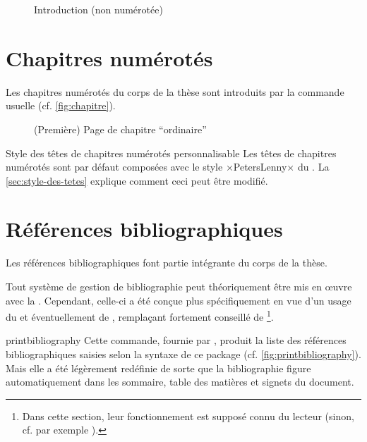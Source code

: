 \begin{figure}[p]
  \centering
  \caption{Introduction (non numérotée)}
  \label{fig:introduction}
\end{figure}

\section{Chapitres numérotés}
\label{sec:chapitres-numerotes}

Les chapitres numérotés du corps de la thèse sont introduits par la commande
usuelle  (cf. \vref{fig:chapitre}).

\begin{figure}[ht]
  \centering
  \caption[Chapitre \enquote{ordinaire}]{(Première) Page de chapitre
    \enquote{ordinaire}}
  \label{fig:chapitre}
\end{figure}

\begin{dbremark}{Style des têtes de chapitres numérotés personnalisable}{}
  Les têtes de chapitres numérotés sont par défaut composées avec le style
  ×PetersLenny× du . La \vref{sec:style-des-tetes} explique
  comment ceci peut être modifié.
\end{dbremark}

\section{Références bibliographiques}

Les références bibliographiques font partie intégrante du corps de la thèse.

Tout système de gestion de bibliographie peut théoriquement être mis en œuvre
avec la \yatcl. Cependant, celle-ci a été conçue plus spécifiquement en vue
d'un usage du  et éventuellement de ,
remplaçant fortement conseillé de \footnote{Dans cette section,
  leur fonctionnement est supposé connu du lecteur (sinon, cf. par exemple
  \cite{en-ligne6}).}.

\begin{docCommand}[doc description=\mandatory]{printbibliography}{}
  Cette commande, fournie par , produit la liste des
  références bibliographiques saisies selon la syntaxe de ce package (cf.
  \vref{fig:printbibliography}). Mais elle a été légèrement redéfinie de sorte
  que la bibliographie figure automatiquement dans les sommaire, table des
  matières et signets du document.
\end{docCommand}

